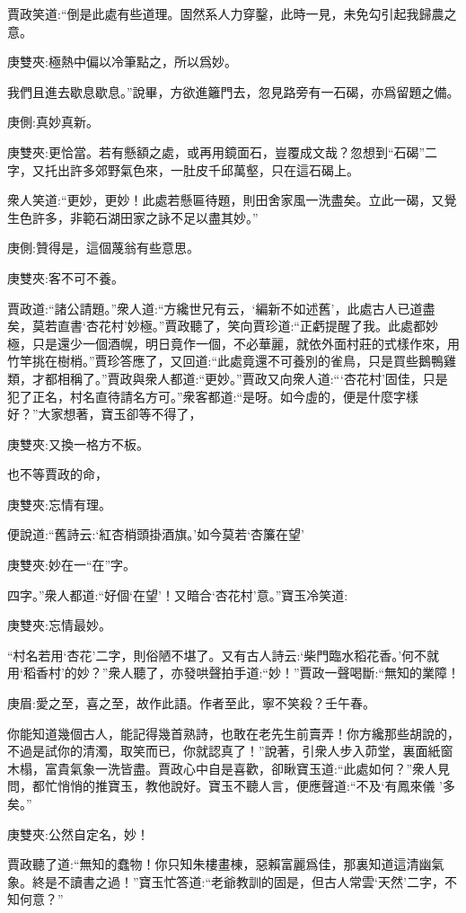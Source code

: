 \begin{parag}
    賈政笑道:“倒是此處有些道理。固然系人力穿鑿，此時一見，未免勾引起我歸農之意。\begin{note}庚雙夾:極熱中偏以冷筆點之，所以爲妙。\end{note}我們且進去歇息歇息。”說畢，方欲進籬門去，忽見路旁有一石碣，亦爲留題之備。\begin{note}庚側:真妙真新。\end{note}\begin{note}庚雙夾:更恰當。若有懸額之處，或再用鏡面石，豈覆成文哉？忽想到“石碣”二字，又托出許多郊野氣色來，一肚皮千邱萬壑，只在這石碣上。\end{note}衆人笑道:“更妙，更妙！此處若懸匾待題，則田舍家風一洗盡矣。立此一碣，又覺生色許多，非範石湖田家之詠不足以盡其妙。”\begin{note}庚側:贊得是，這個蔑翁有些意思。\end{note}\begin{note}庚雙夾:客不可不養。\end{note}賈政道:“諸公請題。”衆人道:“方纔世兄有云，‘編新不如述舊’，此處古人已道盡矣，莫若直書‘杏花村’妙極。”賈政聽了，笑向賈珍道:“正虧提醒了我。此處都妙極，只是還少一個酒幌，明日竟作一個，不必華麗，就依外面村莊的式樣作來，用竹竿挑在樹梢。”賈珍答應了，又回道:“此處竟還不可養別的雀鳥，只是買些鵝鴨雞類，才都相稱了。”賈政與衆人都道:“更妙。”賈政又向衆人道:“‘杏花村’固佳，只是犯了正名，村名直待請名方可。”衆客都道:“是呀。如今虛的，便是什麼字樣好？”大家想著，寶玉卻等不得了，\begin{note}庚雙夾:又換一格方不板。\end{note}也不等賈政的命，\begin{note}庚雙夾:忘情有理。\end{note}便說道:“舊詩云:‘紅杏梢頭掛酒旗。’如今莫若‘杏簾在望’\begin{note}庚雙夾:妙在一“在”字。\end{note}四字。”衆人都道:“好個‘在望’！又暗合‘杏花村’意。”寶玉冷笑道:\begin{note}庚雙夾:忘情最妙。\end{note}“村名若用‘杏花’二字，則俗陋不堪了。又有古人詩云:‘柴門臨水稻花香。’何不就用‘稻香村’的妙？”衆人聽了，亦發哄聲拍手道:“妙！”賈政一聲喝斷:“無知的業障！\begin{note}庚眉:愛之至，喜之至，故作此語。作者至此，寧不笑殺？壬午春。\end{note}你能知道幾個古人，能記得幾首熟詩，也敢在老先生前賣弄！你方纔那些胡說的，不過是試你的清濁，取笑而已，你就認真了！”說著，引衆人步入茆堂，裏面紙窗木榻，富貴氣象一洗皆盡。賈政心中自是喜歡，卻瞅寶玉道:“此處如何？”衆人見問，都忙悄悄的推寶玉，教他說好。寶玉不聽人言，便應聲道:“不及‘有鳳來儀 ’多矣。”\begin{note}庚雙夾:公然自定名，妙！\end{note}賈政聽了道:“無知的蠢物！你只知朱樓畫棟，惡賴富麗爲佳，那裏知道這清幽氣象。終是不讀書之過！”寶玉忙答道:“老爺教訓的固是，但古人常雲‘天然’二字，不知何意？”
\end{parag}


